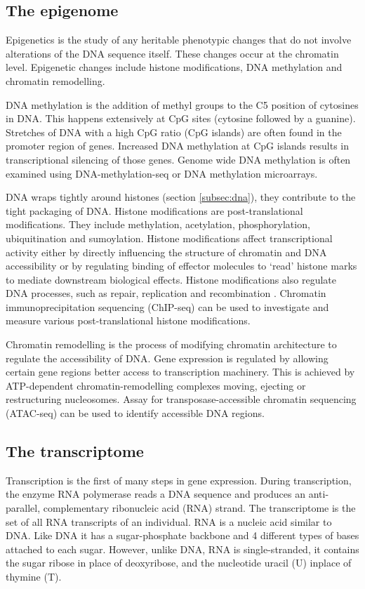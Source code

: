 \subsection{The epigenome}
Epigenetics is the study of any heritable phenotypic changes that do not involve alterations of the DNA sequence itself.
These changes occur at the chromatin level.
Epigenetic changes include histone modifications, DNA methylation and chromatin remodelling.

DNA methylation is the addition of methyl groups to the C5 position of cytosines in DNA.
This happens extensively at CpG sites (cytosine followed by a guanine).
Stretches of DNA with a high CpG ratio (CpG islands) are often found in the promoter region of genes.
Increased DNA methylation at CpG islands results in transcriptional silencing of those genes.
Genome wide DNA methylation is often examined using DNA-methylation-seq or DNA methylation microarrays.

DNA wraps tightly around histones (section \ref{subsec:dna}), they contribute to the tight packaging of DNA.
Histone modifications are post-translational modifications.
They include methylation, acetylation, phosphorylation, ubiquitination and sumoylation.
Histone modifications affect transcriptional activity either by directly influencing the structure of chromatin and DNA accessibility or by regulating binding of effector molecules to `read' histone marks to mediate downstream biological effects.
Histone modifications also regulate DNA processes, such as repair, replication and recombination \cite{ bannister2011regulation}.
Chromatin immunoprecipitation sequencing (ChIP-seq) can be used to investigate and measure various post-translational histone modifications.

Chromatin remodelling is the process of modifying chromatin architecture to regulate the accessibility of DNA.
Gene expression is regulated by allowing certain gene regions better access to transcription machinery.
This is achieved by ATP-dependent chromatin-remodelling complexes moving, ejecting or restructuring nucleosomes.
Assay for transposase-accessible chromatin sequencing (ATAC-seq) can be used to identify accessible DNA regions.


\subsection{The transcriptome}
Transcription is the first of many steps in gene expression.
During transcription, the enzyme RNA polymerase reads a DNA sequence and produces an anti-parallel, complementary ribonucleic acid (RNA) strand.
The transcriptome is the set of all RNA transcripts of an individual.
RNA is a nucleic acid similar to DNA. Like DNA it has a sugar-phosphate backbone and 4 different types of bases attached to each sugar.
However, unlike DNA, RNA is single-stranded, it contains the sugar ribose in place of deoxyribose, and the nucleotide uracil (U) inplace of thymine (T).

